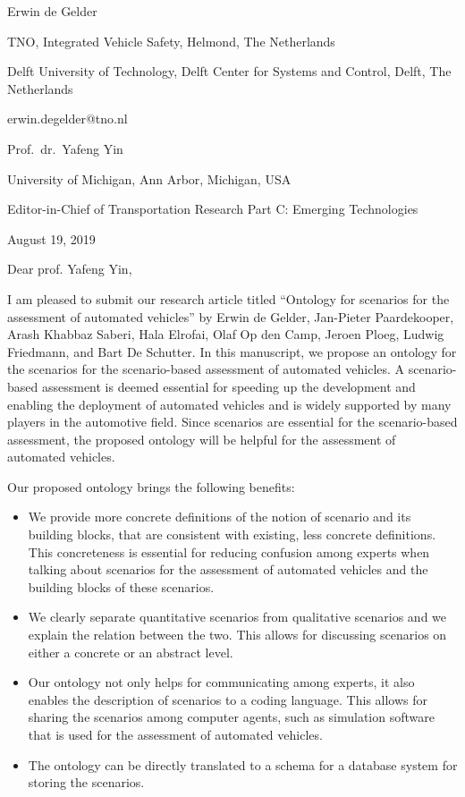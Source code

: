 \documentclass{article}
\begin{document}
Erwin de Gelder

TNO, Integrated Vehicle Safety, Helmond, The Netherlands

Delft University of Technology, Delft Center for Systems and Control, Delft, The Netherlands

erwin.degelder@tno.nl

\vspace{1em}

Prof.\ dr.\ Yafeng Yin

University of Michigan, Ann Arbor, Michigan, USA

Editor-in-Chief of Transportation Research Part C: Emerging Technologies

\vspace{1em}

August 19, 2019

\vspace{2em}


Dear prof. Yafeng Yin,

\vspace{1em}

I am pleased to submit our research article titled “Ontology for scenarios for the assessment of automated vehicles” by Erwin de Gelder, Jan-Pieter Paardekooper, Arash Khabbaz Saberi, Hala Elrofai, Olaf Op den Camp, Jeroen Ploeg, Ludwig Friedmann, and Bart De Schutter. In this manuscript, we propose an ontology for the scenarios for the scenario-based assessment of automated vehicles. A scenario-based assessment is deemed essential for speeding up the development and enabling the deployment of automated vehicles and is widely supported by many players in the automotive field. Since scenarios are essential for the scenario-based assessment, the proposed ontology will be helpful for the assessment of automated vehicles.

Our proposed ontology brings the following benefits:
\begin{itemize}
	\item We provide more concrete definitions of the notion of scenario and its building blocks, that are consistent with existing, less concrete definitions. This concreteness is essential for reducing confusion among experts when talking about scenarios for the assessment of automated vehicles and the building blocks of these scenarios.
	\item We clearly separate quantitative scenarios from qualitative scenarios and we explain the relation between the two. This allows for discussing scenarios on either a concrete or an abstract level.
	\item Our ontology not only helps for communicating among experts, it also enables the description of scenarios to a coding language. This allows for sharing the scenarios among computer agents, such as simulation software that is used for the assessment of automated vehicles.
	\item The ontology can be directly translated to a schema for a database system for storing the scenarios.
\end{itemize}
\end{document}
